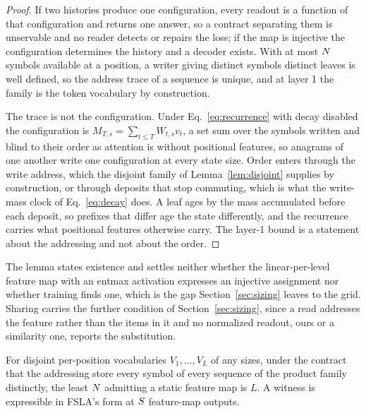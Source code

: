 \begin{proof}
If two histories produce one configuration, every readout is a function of that configuration and returns one answer, so a contract separating them is unservable and no reader detects or repairs the loss; if the map is injective the configuration determines the history and a decoder exists. With at most $N$ symbols available at a position, a writer giving distinct symbols distinct leaves is well defined, so the address trace of a sequence is unique, and at layer 1 the family is the token vocabulary by construction.

The trace is not the configuration. Under Eq.~\eqref{eq:recurrence} with decay disabled the configuration is $M_{T,s} = \sum_{t \le T} W_{t,s} v_t$, a set sum over the symbols written and blind to their order as attention is without positional features, so anagrams of one another write one configuration at every state size. Order enters through the write address, which the disjoint family of Lemma~\ref{lem:disjoint} supplies by construction, or through deposits that stop commuting, which is what the write-mass clock of Eq.~\eqref{eq:decay} does. A leaf ages by the mass accumulated before each deposit, so prefixes that differ age the state differently, and the recurrence carries what positional features otherwise carry. The layer-1 bound is a statement about the addressing and not about the order.
\end{proof}

The lemma states existence and settles neither whether the linear-per-level feature map with an entmax activation expresses an injective assignment nor whether training finds one, which is the gap Section~\ref{sec:sizing} leaves to the grid. Sharing carries the further condition of Section~\ref{sec:sizing}, since a read addresses the feature rather than the items in it and no normalized readout, ours or a similarity one, reports the substitution.

\begin{lemma}[Disjoint families are tight at $\Nst = L$]
\label{lem:disjoint}
For disjoint per-position vocabularies $V_1,\dots,V_L$ of any sizes, under the contract that the addressing store every symbol of every sequence of the product family distinctly, the least $N$ admitting a static feature map is $L$. A witness is expressible in FSLA's form at $S$ feature-map outputs.
\end{lemma}

